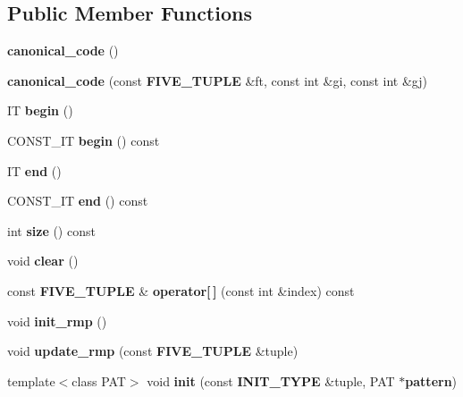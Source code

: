 \subsection*{Public Member Functions}
\begin{CompactItemize}
\item 
{\bf canonical\_\-code} ()\label{classcanonical__code_3_01GRAPH__PROP_00_01V__T_00_01E__T_01_4_a0}

\item 
{\bf canonical\_\-code} (const  {\bf FIVE\_\-TUPLE} \&ft, const  int \&gi, const  int \&gj)
\item 
IT {\bf begin} ()\label{classcanonical__code_3_01GRAPH__PROP_00_01V__T_00_01E__T_01_4_a2}

\item 
CONST\_\-IT {\bf begin} () const \label{classcanonical__code_3_01GRAPH__PROP_00_01V__T_00_01E__T_01_4_a3}

\item 
IT {\bf end} ()\label{classcanonical__code_3_01GRAPH__PROP_00_01V__T_00_01E__T_01_4_a4}

\item 
CONST\_\-IT {\bf end} () const \label{classcanonical__code_3_01GRAPH__PROP_00_01V__T_00_01E__T_01_4_a5}

\item 
int {\bf size} () const \label{classcanonical__code_3_01GRAPH__PROP_00_01V__T_00_01E__T_01_4_a6}

\item 
void {\bf clear} ()\label{classcanonical__code_3_01GRAPH__PROP_00_01V__T_00_01E__T_01_4_a7}

\item 
const  {\bf FIVE\_\-TUPLE} \& {\bf operator[$\,$]} (const  int \&index) const \label{classcanonical__code_3_01GRAPH__PROP_00_01V__T_00_01E__T_01_4_a8}

\item 
void {\bf init\_\-rmp} ()\label{classcanonical__code_3_01GRAPH__PROP_00_01V__T_00_01E__T_01_4_a9}

\item 
void {\bf update\_\-rmp} (const  {\bf FIVE\_\-TUPLE} \&tuple)\label{classcanonical__code_3_01GRAPH__PROP_00_01V__T_00_01E__T_01_4_a10}

\item 
template$<$class PAT$>$ void {\bf init} (const  {\bf INIT\_\-TYPE} \&tuple, PAT $\ast${\bf pattern})\label{classcanonical__code_3_01GRAPH__PROP_00_01V__T_00_01E__T_01_4_a11}


\end{CompactItemize}
